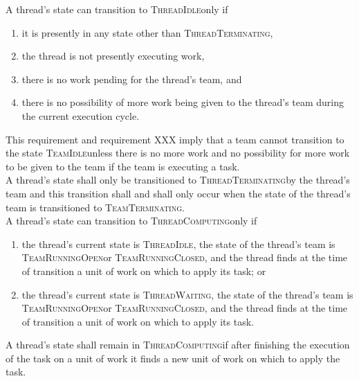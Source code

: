 \documentclass{article}
\newcommand{\TeamIdle}          {\textsc{TeamIdle}}
\newcommand{\TeamRunningOpen}   {\textsc{TeamRunningOpen}}
\newcommand{\TeamRunningClosed} {\textsc{TeamRunningClosed}}
\newcommand{\TeamTerminating}   {\textsc{TeamTerminating}}
\newcommand{\ThreadIdle}        {\textsc{ThreadIdle}}
\newcommand{\ThreadComputing}   {\textsc{ThreadComputing}}
\newcommand{\ThreadWaiting}     {\textsc{ThreadWaiting}}
\newcommand{\ThreadTerminating} {\textsc{ThreadTerminating}}
\begin{document}
A thread's state can transition to \ThreadIdle only if
\begin{enumerate}
\item{it is presently in any state other than \ThreadTerminating,}
\item{the thread is not presently executing work,}
\item{there is no work pending for the thread's team, and}
\item{there is no possibility of more work being given to the thread's team
during the current execution cycle.}
\end{enumerate}
This requirement and requirement XXX imply that a team cannot transition to the
state \TeamIdle unless there is no more work and no possibility for more work to
be given to the team if the team is executing a task.\\

A thread's state shall only be transitioned to \ThreadTerminating by the
thread's team and this transition shall and shall only occur when the
state of the thread's team is transitioned to \TeamTerminating.\\

A thread's state can transition to \ThreadComputing only if
\begin{enumerate}
\item{the thread's current state is \ThreadIdle, the state of the thread's team
is \TeamRunningOpen or \TeamRunningClosed, and the thread finds at the time of
transition a unit of work on which to apply its task; or}
\item{the thread's current state is \ThreadWaiting, the state of the thread's
team is \TeamRunningOpen or \TeamRunningClosed, and the thread finds at the time
of transition a unit of work on which to apply its task.}
\end{enumerate}
A thread's state shall remain in \ThreadComputing if after finishing the
execution of the task on a unit of work it finds a new unit of work on which to
apply the task.\\
\end{document}
